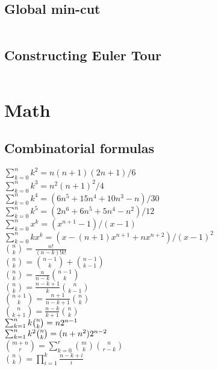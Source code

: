 \documentclass[letterpaper,landscape]{article}
\begin{document}
\begin{multicols*}{2}
  \subsection{Global min-cut}
  \inputminted{cpp}{src/Stoer-Wagner.cpp}

  \subsection{Constructing Euler Tour}
  \inputminted{cpp}{src/Euler.cpp}
  
  \section{Math}
  
  \subsection{Combinatorial formulas}
  
   $\sum_{k=0}^{n}k^{2}=n(n+1)(2n+1)/6$\\
   $\sum_{k=0}^{n}k^{3}=n^{2}(n+1)^{2}/4$\\
   $\sum_{k=0}^{n}k^{4}=(6n^{5}+15n^{4}+10n^{3}-n)/30$\\
   $\sum_{k=0}^{n}k^{5}=(2n^{6}+6n^{5}+5n^{4}-n^{2})/12$\\
   $\sum_{k=0}^{n}x^{k}=(x^{n+1}-1)/(x-1)$\\
   $\sum_{k=0}^{n}kx^{k}=(x-(n+1)x^{n+1}+nx^{n+2})/(x-1)^{2}$\\
   ${n \choose k}=\frac{n!}{(n-k)!k!}$\\
   ${n \choose k}={n-1 \choose k}+{n-1 \choose k-1}$\\
   ${n \choose k}=\frac{n}{n-k}{n-1 \choose k}$\\
   ${n \choose k}=\frac{n-k+1}{k}{n \choose k-1}$\\
   ${n+1 \choose k}=\frac{n+1}{n-k+1}{n \choose k}$\\
   ${n \choose k+1}=\frac{n-k}{k+1}{n \choose k}$\\
   $\sum_{k=1}^{n}k\tbinom{n}{k}=n2^{n-1}$\\
   $\sum_{k=1}^{n}k^{2}\tbinom{n}{k}=(n+n^{2})2^{n-2}$\\
   ${m+n \choose r}=\sum_{k=0}^{r}{m \choose k}{n \choose r-k}$\\
   ${n \choose k}=\prod_{i=1}^{k}\frac{n-k+i}{i}$\\
   

  

\end{multicols*}
\end{document}
